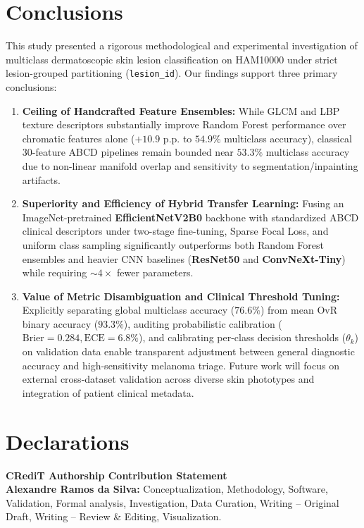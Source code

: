 \documentclass[11pt,a4paper]{article}
\begin{document}
\section{Conclusions}
This study presented a rigorous methodological and experimental investigation of multiclass dermatoscopic skin lesion classification on HAM10000 under strict lesion-grouped partitioning (\texttt{lesion\_id}). Our findings support three primary conclusions:
\begin{enumerate}
    \item \textbf{Ceiling of Handcrafted Feature Ensembles:} While GLCM and LBP texture descriptors substantially improve Random Forest performance over chromatic features alone ($+10.9$ p.p. to $54.9\%$ multiclass accuracy), classical 30-feature ABCD pipelines remain bounded near $53.3\%$ multiclass accuracy due to non-linear manifold overlap and sensitivity to segmentation/inpainting artifacts.
    \item \textbf{Superiority and Efficiency of Hybrid Transfer Learning:} Fusing an ImageNet-pretrained \textbf{EfficientNetV2B0} backbone with standardized ABCD clinical descriptors under two-stage fine-tuning, Sparse Focal Loss, and uniform class sampling significantly outperforms both Random Forest ensembles and heavier CNN baselines (\textbf{ResNet50} and \textbf{ConvNeXt-Tiny}) while requiring $\sim 4\times$ fewer parameters.
    \item \textbf{Value of Metric Disambiguation and Clinical Threshold Tuning:} Explicitly separating global multiclass accuracy ($76.6\%$) from mean OvR binary accuracy ($93.3\%$), auditing probabilistic calibration ($\text{Brier} = 0.284, \text{ECE} = 6.8\%$), and calibrating per-class decision thresholds ($\theta_k$) on validation data enable transparent adjustment between general diagnostic accuracy and high-sensitivity melanoma triage. Future work will focus on external cross-dataset validation across diverse skin phototypes and integration of patient clinical metadata.
\end{enumerate}

\section*{Declarations}

\noindent\textbf{CRediT Authorship Contribution Statement}\\
\textbf{Alexandre Ramos da Silva:} Conceptualization, Methodology, Software, Validation, Formal analysis, Investigation, Data Curation, Writing -- Original Draft, Writing -- Review \& Editing, Visualization.
\end{document}

